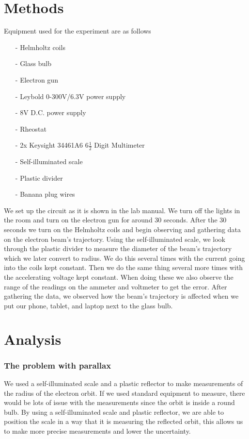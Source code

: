 \documentclass{article}
\begin{document}
\section{Methods}
Equipment used for the experiment are as follows
\begin{itemize}
    \item[-] Helmholtz coils
    \item[-] Glass bulb
    \item[-] Electron gun
    \item[-] Leybold 0-300V/6.3V power supply
    \item[-] 8V D.C. power supply
    \item[-] Rheostat
    \item[-] 2x Keysight 34461A6 6$\frac{1}{2}$ Digit Multimeter
    \item[-] Self-illuminated scale
    \item[-] Plastic divider
    \item[-] Banana plug wires
\end{itemize}
We set up the circuit as it is shown in the lab manual.  We turn off the lights
in the room and turn on the electron gun for around 30 seconds.  After the 30
seconds we turn on the Helmholtz coils and begin observing and gathering data on the
electron beam's trajectory.  Using the self-illuminated scale, we look through the 
plastic divider to measure the diameter of the beam's trajectory which we later 
convert to radius.  We do this several times with the current going into the coils 
kept constant.  Then we do the same thing several more times with the accelerating 
voltage kept constant.  When doing these we also observe the range 
of the readings on the ammeter and voltmeter to get the error.  After gathering the 
data, we observed how the beam's trajectory is affected when we put our phone, tablet, 
and laptop next to the glass bulb.

\section{Analysis}
\subsubsection*{The problem with parallax}
We used a self-illuminated scale and a plastic reflector to make measurements
of the radius of the electron orbit. If we used standard equipment to measure,
there would be lots of issue with the measurements since the orbit is inside a
round bulb. By using a self-illuminated scale and plastic reflector, we are able
to position the scale in a way that it is measuring the reflected orbit, this
allows us to make more precise measurements and lower the uncertainty.
\end{document}
